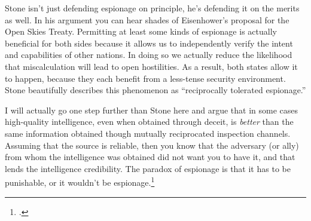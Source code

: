 \documentclass{memoir}
\begin{document}
\begin{refsegment}

Stone isn't just defending espionage on principle, he's defending it on the merits as well. In his argument you can hear shades of Eisenhower's proposal for the Open Skies Treaty. Permitting at least some kinds of espionage is actually beneficial for both sides because it allows us to independently verify the intent and capabilities of other nations. In doing so we actually reduce the likelihood that miscalculation will lead to open hostilities. As a result, both states allow it to happen, because they each benefit from a less-tense security environment. Stone beautifully describes this phenomenon as ``reciprocally tolerated espionage.''


I will actually go one step further than Stone here and argue that in some cases high-quality intelligence, even when obtained through deceit, is \emph{better} than the same information obtained though mutually reciprocated inspection channels. Assuming that the source is reliable, then you know that the adversary (or ally) from whom the intelligence was obtained did not want you to have it, and that lends the intelligence credibility. The paradox of espionage is that it has to be punishable, or it wouldn't be espionage.\footcite[p.~347]{demarest_espionage_1995}







\end{refsegment}
\end{document}
